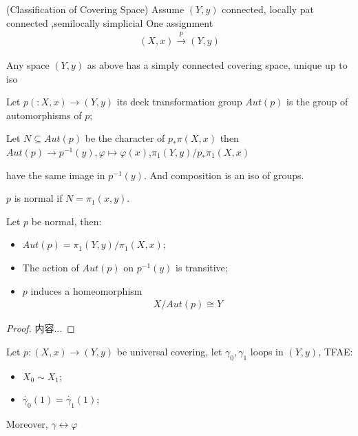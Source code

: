 \documentclass[Total.tex]{subfiles}
\begin{document}
\begin{proposition}
				\begin{proposition}
					(Classification of Covering Space) Assume $(Y,y)$ connected, locally pat connected ,semilocally simplicial 
					One assignment
					\begin{gather*}
						(X,x)\stackrel{p}{\rightarrow} (Y,y)
					\end{gather*}
				\end{proposition}
				
				\begin{corollary}
					Any space $(Y,y)$ as above has a simply connected covering space, unique up to iso
				\end{corollary}
				
				\begin{Def}
					Let $p(:X,x)\rightarrow (Y,y)$ its deck transformation group $Aut(p)$ is the group of automorphisms of $p$;
				\end{Def}
				
				\begin{proposition}
					Let $N\subseteq Aut(p)$ be the character of $p_*\pi(X,x)$ then $Aut(p)\rightarrow p^{-1}(y),\varphi\mapsto \varphi(x)$,$\pi_1(Y,y)/p_*\pi_1(X,x)$
				\end{proposition}
				have the same image in $p^{-1}(y)$. And composition is an iso of groups.
			\end{proposition}
			\begin{Def}
				$p$ is normal if $N=\pi_1(x,y)$.
			\end{Def}
			
			\begin{corollary}
				Let $p$ be normal, then:
				\begin{itemize}
					\item $Aut(p)=\pi_1(Y,y)/\pi_1(X,x)$;
					\item The action of $Aut(p)$ on $p^{-1}(y)$ is transitive;
					\item $p$ induces a homeomorphism
					\begin{gather*}
						X/Aut(p)\cong Y
					\end{gather*}
				\end{itemize}
			\end{corollary}
			\begin{proof}
				内容...
			\end{proof}
			
			\begin{corollary}
				Let $p:(X,x)\rightarrow (Y,y)$ be universal covering, let $\gamma_0,\gamma_1$ loops in $(Y,y)$, TFAE:
				\begin{itemize}
					\item $X_0\sim X_1$;
					\item $\dot{\gamma_0}(1)=\dot{\gamma_1}(1)$;
				\end{itemize}
				Moreover, $\gamma\leftrightarrow \varphi$
			\end{corollary}
\end{document}
